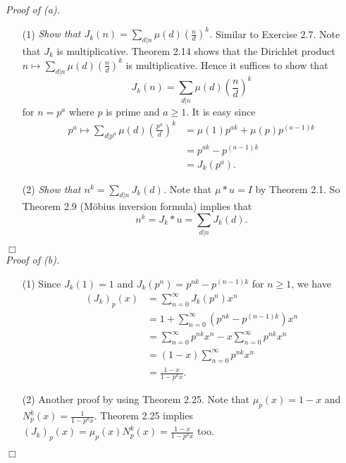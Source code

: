 \documentclass{article}
\begin{document}
\emph{Proof of (a).}
\begin{enumerate}
\item[(1)]
  \emph{Show that $J_k(n) = \sum_{d|n} \mu(d) \left( \frac{n}{d} \right)^k$.}
  Similar to Exercise 2.7.
  Note that $J_k$ is multiplicative.
  Theorem 2.14 shows that
  the Dirichlet product $n \mapsto \sum_{d|n} \mu(d) \left( \frac{n}{d} \right)^k$ is multiplicative.
  Hence it suffices to show that
  \[
    J_k(n) = \sum_{d|n} \mu(d) \left( \frac{n}{d} \right)^k
  \]
  for $n = p^a$ where $p$ is prime and $a \geq 1$.
  It is easy since
  \begin{align*}
    p^a \mapsto \sum_{d|p^a} \mu(d) \left( \frac{p^a}{d} \right)^k
    &= \mu(1) p^{ak} + \mu(p) p^{(a-1)k} \\
    &= p^{ak} - p^{(a-1)k} \\
    &= J_k(p^a).
  \end{align*}

\item[(2)]
  \emph{Show that $n^k = \sum_{d|n} J_k(d)$.}
  Note that $\mu * u = I$ by Theorem 2.1.
  So Theorem 2.9 (M\"obius inversion formula) implies that
  \[
    n^k = J_k * u = \sum_{d|n} J_k(d).
  \]
\end{enumerate}
$\Box$ \\



\emph{Proof of (b).}
\begin{enumerate}
\item[(1)]
  Since $J_k(1) = 1$ and $J_k(p^n) = p^{nk} - p^{(n-1)k}$ for $n \geq 1$,
  we have
  \begin{align*}
    (J_k)_p(x)
    &= \sum_{n=0}^{\infty} J_k(p^n) x^n \\
    &= 1 + \sum_{n=0}^{\infty} \left(p^{nk} - p^{(n-1)k}\right) x^n \\
    &= \sum_{n=0}^{\infty} p^{nk} x^n - x \sum_{n=0}^{\infty} p^{nk} x^n \\
    &= (1-x) \sum_{n=0}^{\infty} p^{nk} x^n \\
    &= \frac{1-x}{1 - p^k x}.
  \end{align*}

\item[(2)]
  Another proof by using Theorem 2.25.
  Note that $\mu_p(x) = 1 - x$ and $N^k_p(x) = \frac{1}{1 - p^k x}$.
  Theorem 2.25 implies
  $(J_k)_p(x) = \mu_p(x) N^k_p(x) = \frac{1-x}{1 - p^k x}$ too.
\end{enumerate}
$\Box$ \\\\
\end{document}
